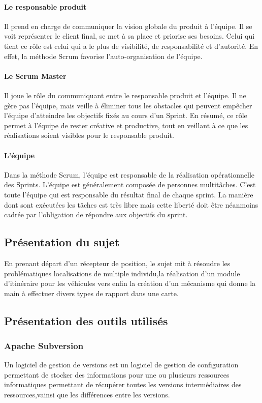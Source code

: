 \paragraph{Le responsable produit}
Il prend en charge de communiquer la
vision globale du produit à l’équipe. 
Il se voit représenter le client final, se met à sa place
et priorise ses besoins. Celui qui tient ce rôle est celui qui 
a le plus de visibilité, de responsabilité et d’autorité.
En effet, la méthode Scrum favorise l’auto-organisation de l'équipe.
\paragraph{Le Scrum Master}
Il joue le rôle du communiquant entre le responsable produit et
l’équipe. Il ne gère pas l’équipe, mais veille à éliminer tous les obstacles qui peuvent
empêcher l’équipe d’atteindre les objectifs fixés au cours d’un Sprint. En résumé, ce rôle
permet à l’équipe de rester créative et productive, tout en veillant à ce que les
réalisations soient visibles pour le responsable produit.
\paragraph{L'équipe}
Dans la méthode Scrum, l’équipe est responsable de la réalisation
opérationnelle des Sprints. L’équipe est généralement composée de personnes
multitâches. C’est toute l’équipe qui est responsable du résultat final de chaque sprint.
La manière dont sont exécutées les tâches est très libre mais cette liberté doit être
néanmoins cadrée par l’obligation de répondre aux objectifs du sprint.
\subsection{Présentation du sujet}
En prenant départ d'un récepteur de position, le sujet mit à résoudre les
problématiques localisations de multiple individu,la réalisation d'un module
d'itinéraire pour les véhicules vers enfin la création d'un mécanisme qui donne
la main à effectuer divers types de rapport dans une carte.

\subsection{Présentation des outils utilisés}
\subsubsection{Apache Subversion}
Un logiciel de gestion de versions est un logiciel de gestion de configuration
permettant de stocker des informations pour une ou plusieurs ressources
informatiques permettant de récupérer toutes les versions intermédiaires des
ressources,vainsi que les différences entre les versions.

